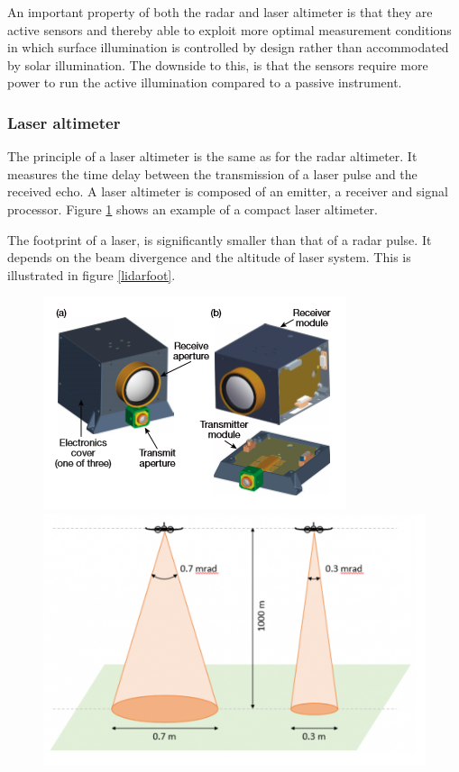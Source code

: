 An important property of both the radar and laser altimeter is that they are active sensors and thereby able to exploit more optimal measurement conditions in which surface illumination is controlled by design rather than accommodated by  solar illumination. The downside to this, is that the sensors require more power to run the active illumination compared to a passive instrument. 

\subsubsection{Laser altimeter}

The principle of a laser altimeter is the same as for the radar altimeter. It measures the time delay between the transmission of a laser pulse and the received echo.  A laser altimeter is composed of an emitter, a receiver and signal processor. Figure \ref{alti} shows an example of a compact laser altimeter. 

The footprint of a laser, is significantly smaller than that of a radar pulse. It depends on the beam divergence and the altitude of laser system. This is illustrated in figure \ref{lidarfoot}.

\begin{figure}[H]
\begin{center}
\includegraphics[scale=0.6]{figures/CLA.png}
\includegraphics[scale=0.6]{figures/lidarfoot.png}
\caption{\citep{http://felix.rohrba.ch/en/2015/lidar-footprint-diameter/}}
\label{alti}
\end{center}
\end{figure}

